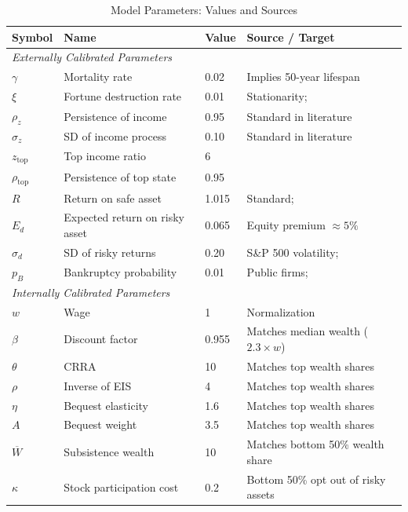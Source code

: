 \documentclass[12pt]{article}
\begin{document}
\begin{table}[htbp]
\centering
\caption{Model Parameters: Values and Sources}
\label{tab:parameters}
\begin{adjustbox}{width=\textwidth}
\begin{tabular}{llll}
\toprule
\textbf{Symbol} & \textbf{Name} & \textbf{Value} & \textbf{Source / Target} \\
\midrule
\multicolumn{4}{l}{\textit{Externally Calibrated Parameters}} \\
\addlinespace
$\gamma$       & Mortality rate                   & 0.02    & Implies 50-year lifespan \\
$\xi$          & Fortune destruction rate         & 0.01    & Stationarity; \textcite{benhabib2017} \\
$\rho_z$       & Persistence of income            & 0.95    & Standard in literature \\
$\sigma_z$     & SD of income process             & 0.10    & Standard in literature \\
$z_{\text{top}}$ & Top income ratio               & 6       & \textcite{piketty2018} \\
$\rho_{\text{top}}$ & Persistence of top state    & 0.95    & \textcite{benhabib2019} \\
$R$            & Return on safe asset             & 1.015   & Standard; \textcite{gourinchas2002} \\
$E_d$          & Expected return on risky asset   & 0.065   & Equity premium $\approx 5\%$ \\
$\sigma_d$     & SD of risky returns              & 0.20    & S\&P 500 volatility; \textcite{cochrane2005} \\
$p_B$          & Bankruptcy probability           & 0.01    & Public firms; \textcite{barro2006} \\
\midrule
\multicolumn{4}{l}{\textit{Internally Calibrated Parameters}} \\
\addlinespace
$w$            & Wage                             & 1       & Normalization \\
$\beta$        & Discount factor                  & 0.955    & Matches median wealth ($2.3 \times w$) \\
$\theta$       & CRRA                             & 10      & Matches top wealth shares \\
$\rho$         & Inverse of EIS                   & 4       & Matches top wealth shares \\
$\eta$         & Bequest elasticity               & 1.6     & Matches top wealth shares \\
$A$            & Bequest weight                   & 3.5     & Matches top wealth shares \\
$\overline{W}$ & Subsistence wealth               & 10      & Matches bottom 50\% wealth share \\
$\kappa$       & Stock participation cost         & 0.2     & Bottom 50\% opt out of risky assets \\
\bottomrule
\end{tabular}
\end{adjustbox}
\end{table}
\end{document}
